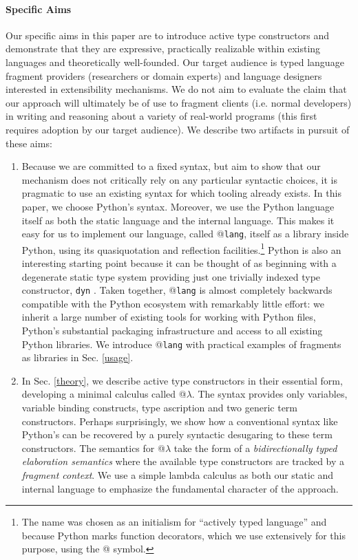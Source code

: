 \documentclass[9pt,preprint]{sigplanconf}
\begin{document}
\paragraph{Specific Aims} Our specific aims in this paper are to introduce active type constructors and demonstrate that they are expressive, practically realizable within existing languages and theoretically well-founded. Our target audience is typed language fragment providers (researchers or domain experts) and language designers interested in extensibility mechanisms. We do not aim to evaluate the claim that our approach will ultimately be of use to fragment clients (i.e. normal developers) in writing and reasoning about a variety of real-world programs (this first requires adoption by our target audience). We describe two artifacts in pursuit of these aims:
\begin{enumerate}
\item Because we are committed to a fixed syntax, but aim to show that our mechanism does not critically rely on any particular syntactic choices, it is pragmatic to use an existing syntax for which tooling already exists. In this paper, we choose Python's syntax. Moreover, we use the Python language itself as both the static language and the internal language. This makes it easy for us to implement our language, called @\texttt{lang}, itself as a library inside Python, using its quasiquotation and reflection facilities.\footnote{The name was chosen as an initialism for ``actively  typed language'' and because Python marks function decorators, which we use extensively for this purpose, using the @ symbol.} Python is also an interesting starting point  because it  can be thought of as beginning with a degenerate static type system providing just one trivially indexed type constructor, \texttt{dyn} \cite{pfpl}. Taken together, @\texttt{lang} is almost completely backwards compatible with the Python ecosystem with remarkably little effort: we inherit a large number of  existing tools for working with Python files, Python's substantial packaging infrastructure and access to all existing Python libraries. We introduce @\texttt{lang} with practical examples of fragments as libraries in Sec. \ref{usage}.
\item In Sec. \ref{theory}, we describe active type constructors in their essential form, developing a minimal calculus called @$\lambda$. The syntax provides only variables, variable binding constructs, type ascription and two generic term constructors. Perhaps surprisingly, we show how a conventional syntax like Python's can be recovered by a purely syntactic desugaring to these term constructors. The semantics for @$\lambda$ take the form of a \emph{bidirectionally typed elaboration semantics} where the available type constructors are tracked by a \emph{fragment context}. We use a simple lambda calculus as both our static and internal language to emphasize the fundamental character of the approach.
\end{enumerate}
\end{document}
